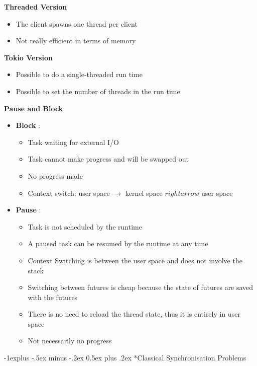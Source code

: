 \documentclass[10pt, landscape]{article}
\makeatletter
\renewcommand{\subsection}{\@startsection{subsection}{2}{0mm}%
                                {-1explus -.5ex minus -.2ex}%
                                {0.5ex plus .2ex}%
                                {\normalfont\normalsize\bfseries}}
\makeatother
\begin{document}
\begin{multicols}{4}
\textbf{Threaded Version} \\
\begin{itemize}
    \item The client spawns  one thread per client 
    \item Not really efficient in terms of memory 
\end{itemize}

\textbf{Tokio Version} \\
\begin{itemize}
    \item Possible to do a single-threaded run time 
    \item Possible to set the number of threads in the run time 
\end{itemize}

\textbf{Pause and Block} \\ 
\begin{itemize}
    \item \textbf{Block} :
    \begin{itemize}
        \item Task waiting for external I/O
        \item Task cannot make progress and will be swapped out 
        \item No progress made
        \item Context switch: user space $\rightarrow$ kernel space $rightarrow$ user space
    \end{itemize}
    \item \textbf{Pause} :
    \begin{itemize}
        \item Task is not scheduled by the runtime 
        \item A paused task can be resumed by the runtime at any time 
        \item Context Switching is between the user space and does not involve the stack 
        \item Switching between futures is cheap because the state of futures are saved with the futures
        \item There is no need to reload the thread state, thus it is entirely in user space
        \item Not necessarily no progress
    \end{itemize}
\end{itemize}

\pagebreak
\subsection*{Classical Synchronisation Problems}


\end{multicols}
\end{document}
